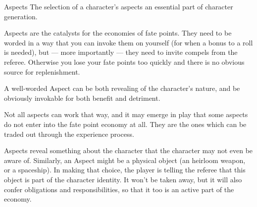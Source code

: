 \begin{sidebox}{Aspects}
The selection of a character's aspects an essential part of character generation.

Aspects are the catalysts for the economies of fate points. They need to be worded in a way that you can invoke them on yourself (for when a bonus to a roll is needed), but --- more importantly --- they need to invite compels from the referee. Otherwise you lose your fate points too quickly and there is no obvious source for replenishment.

A well-worded Aspect can be both revealing of the character's nature, and be obviously invokable for both benefit and detriment.

Not all aspects can work that way, and it may emerge in play that some aspects do not enter into the fate point economy at all. They are the ones which can be traded out through the experience process.

Aspects reveal something about the character that the character may not even be aware of. Similarly, an Aspect might be a physical object (an heirloom weapon, or a spaceship). In making that choice, the player is telling the referee that this object is part of the character identity. It won't be taken away, but it will also confer obligations and responsibilities, so that it too is an active part of the economy.
\end{sidebox}